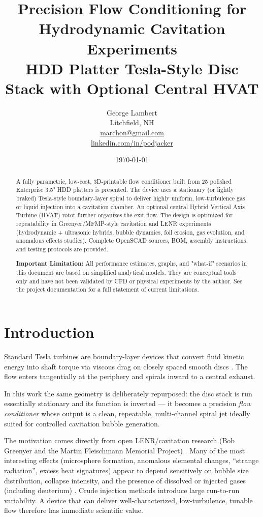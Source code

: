 \documentclass[11pt,a4paper]{article}
\title{\textbf{Precision Flow Conditioning for Hydrodynamic Cavitation Experiments}\\[0.4em]
\large HDD Platter Tesla-Style Disc Stack with Optional Central HVAT}
\author{George Lambert \\ Litchfield, NH \\ \href{mailto:marchon@gmail.com}{marchon@gmail.com} \\ \href{https://www.linkedin.com/in/podjacker}{linkedin.com/in/podjacker}}
\date{\today}
\begin{document}
\maketitle

\begin{abstract}
A fully parametric, low-cost, 3D-printable flow conditioner built from 25 polished Enterprise 3.5" HDD platters is presented. The device uses a stationary (or lightly braked) Tesla-style boundary-layer spiral to deliver highly uniform, low-turbulence gas or liquid injection into a cavitation chamber. An optional central Hybrid Vertical Axis Turbine (HVAT) rotor further organizes the exit flow. The design is optimized for repeatability in Greenyer/MFMP-style cavitation and LENR experiments (hydrodynamic + ultrasonic hybrids, bubble dynamics, foil erosion, gas evolution, and anomalous effects studies). Complete OpenSCAD sources, BOM, assembly instructions, and testing protocols are provided.

\textbf{Important Limitation:} All performance estimates, graphs, and "what-if" scenarios in this document are based on simplified analytical models. They are conceptual tools only and have not been validated by CFD or physical experiments by the author. See the project documentation for a full statement of current limitations.
\end{abstract}

\section{Introduction}

Standard Tesla turbines are boundary-layer devices that convert fluid kinetic energy into shaft torque via viscous drag on closely spaced smooth discs \cite{tesla1913,rice1965}. The flow enters tangentially at the periphery and spirals inward to a central exhaust.

In this work the same geometry is deliberately repurposed: the disc stack is run essentially stationary and its function is inverted — it becomes a precision \emph{flow conditioner} whose output is a clean, repeatable, multi-channel spiral jet ideally suited for controlled cavitation bubble generation.

The motivation comes directly from open LENR/cavitation research (Bob Greenyer and the Martin Fleischmann Memorial Project) \cite{greenyer2020,greenyer2026,greenyer2023}. Many of the most interesting effects (microsphere formation, anomalous elemental changes, ``strange radiation'', excess heat signatures) appear to depend sensitively on bubble size distribution, collapse intensity, and the presence of dissolved or injected gases (including deuterium) \cite{brennen1995,franc2004}. Crude injection methods introduce large run-to-run variability. A device that can deliver well-characterized, low-turbulence, tunable flow therefore has immediate scientific value.
\end{document}
